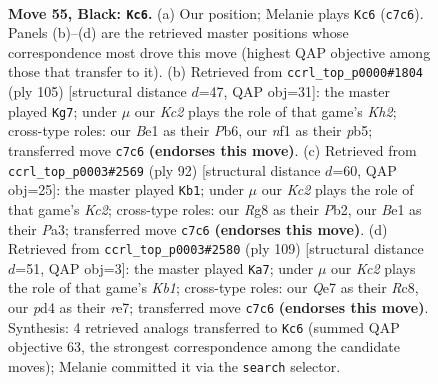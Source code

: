 \documentclass[11pt]{article}
\begin{document}
\clearpage

\begin{figure}[p]\centering
\begin{subfigure}{0.46\textwidth}\centering
\resizebox{\linewidth}{!}{%
\newchessgame
\chessboard[
  setfen={r5r1/p1k1q1p1/7p/3p1Q1P/p2P2P1/4P2K/8/4bN2 b - - 19 55},
  showmover=false,
  pgfstyle=straightmove, color=movearrow, markmove={c7-c6}
]}
\caption{}
\end{subfigure}\hfill
\begin{subfigure}{0.46\textwidth}\centering
\resizebox{\linewidth}{!}{%
\newchessgame
\chessboard[
  setfen={8/r4p1k/1p4p1/1P1Q4/4PP1b/q5pP/4N1P1/1R3K2 b - - 2 53},
  showmover=false,
  pgfstyle=straightmove, color=movearrow, markmove={h7-g7}
]}
\caption{}
\end{subfigure}
\\[4pt]
\begin{subfigure}{0.46\textwidth}\centering
\resizebox{\linewidth}{!}{%
\newchessgame
\chessboard[
  setfen={3r4/3q1p2/kp2p3/p3P3/2pP1R2/P4Q2/1PK2P2/8 w - - 16 47},
  showmover=false,
  pgfstyle=straightmove, color=movearrow, markmove={c2-b1}
]}
\caption{}
\end{subfigure}\hfill
\begin{subfigure}{0.46\textwidth}\centering
\resizebox{\linewidth}{!}{%
\newchessgame
\chessboard[
  setfen={1kr5/2p1R3/3p3p/1QpP4/2P3q1/P4p2/1P6/1K6 b - - 7 55},
  showmover=false,
  pgfstyle=straightmove, color=movearrow, markmove={b8-a7}
]}
\caption{}
\end{subfigure}
\caption{\textbf{Move 55, Black: \texttt{Kc6}.} (a) Our position; Melanie plays \texttt{Kc6} (\texttt{c7c6}). Panels (b)--(d) are the retrieved master positions whose correspondence most drove this move (highest QAP objective among those that transfer to it). (b) Retrieved from \texttt{ccrl\_top\_p0000\#1804} (ply 105) [structural distance $d$=47, QAP obj=31]: the master played \texttt{Kg7}; under $\mu$ our \emph{Kc2} plays the role of that game's \emph{Kh2}; cross-type roles: our \emph{B}e1 as their \emph{P}b6, our \emph{n}f1 as their \emph{p}b5; transferred move \texttt{c7c6} \textbf{(endorses this move)}. (c) Retrieved from \texttt{ccrl\_top\_p0003\#2569} (ply 92) [structural distance $d$=60, QAP obj=25]: the master played \texttt{Kb1}; under $\mu$ our \emph{Kc2} plays the role of that game's \emph{Kc2}; cross-type roles: our \emph{R}g8 as their \emph{P}b2, our \emph{B}e1 as their \emph{P}a3; transferred move \texttt{c7c6} \textbf{(endorses this move)}. (d) Retrieved from \texttt{ccrl\_top\_p0003\#2580} (ply 109) [structural distance $d$=51, QAP obj=3]: the master played \texttt{Ka7}; under $\mu$ our \emph{Kc2} plays the role of that game's \emph{Kb1}; cross-type roles: our \emph{Q}e7 as their \emph{R}c8, our \emph{p}d4 as their \emph{r}e7; transferred move \texttt{c7c6} \textbf{(endorses this move)}. Synthesis: 4 retrieved analogs transferred to \texttt{Kc6} (summed QAP objective 63, the strongest correspondence among the candidate moves); Melanie committed it via the \texttt{search} selector.}
\label{fig:thought-m109}
\end{figure}
\end{document}
